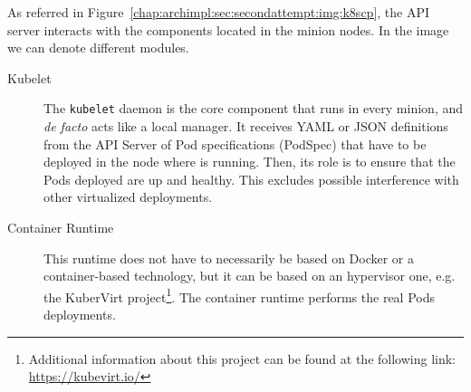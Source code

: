 As referred in Figure~\ref{chap:archimpl:sec:secondattempt:img:k8scp}, the API
server interacts with the components located in the minion nodes. In the image
we can denote different modules.
\begin{description}
\item[Kubelet] The \verb!kubelet! daemon is the core component that runs in
  every minion, and \emph{de facto} acts like a local manager. It receives YAML
  or JSON definitions from the API Server of Pod specifications (PodSpec) that
  have to be deployed in the node where is running. Then, its role is to ensure
  that the Pods deployed are up and healthy. This excludes possible
  interference with other virtualized deployments.
\item[Container Runtime] This runtime does not have to necessarily be based on
  Docker or a container-based technology, but it can be based on an hypervisor
  one, e.g. the KuberVirt project\footnote{Additional information about this
    project can be found at the following link: \url{https://kubevirt.io/}}. The
  container runtime performs the real Pods deployments.


\end{description}
